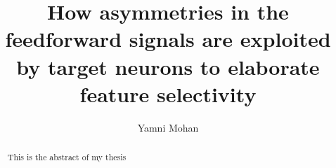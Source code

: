 \documentclass [12pt]{report}
\title{How asymmetries in the feedforward signals are exploited by target neurons to elaborate feature selectivity}
\author{Yamni Mohan}
\date{}
\begin{document}
	\maketitle
	\begin{abstract}
		This is the abstract of my thesis
	\end{abstract}

	\tableofcontents
	
	
	
%	
	
	
	
	
	
%	
%	
	
 


\end{document}
